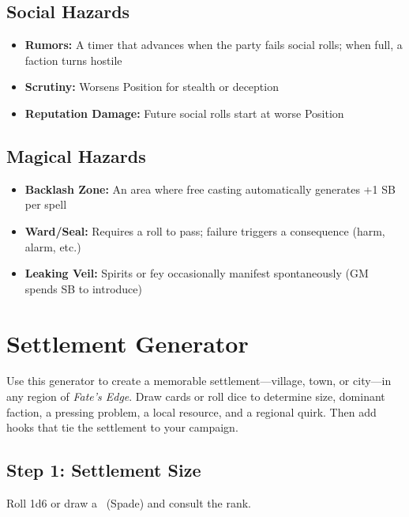 \subsection{Social Hazards}
\begin{itemize}
  \item \textbf{Rumors:} A timer that advances when the party fails social rolls; when full, a faction turns hostile
  \item \textbf{Scrutiny:} Worsens Position for stealth or deception
  \item \textbf{Reputation Damage:} Future social rolls start at worse Position
\end{itemize}

\subsection{Magical Hazards}
\begin{itemize}
  \item \textbf{Backlash Zone:} An area where free casting automatically generates +1 SB per spell
  \item \textbf{Ward/Seal:} Requires a roll to pass; failure triggers a consequence (harm, alarm, etc.)
  \item \textbf{Leaking Veil:} Spirits or fey occasionally manifest spontaneously (GM spends SB to introduce)
\end{itemize}

\clearpage
\section{Settlement Generator}
\label{sec:settlement-generator}

Use this generator to create a memorable settlement---village, town, or city---in any region of \textit{Fate's Edge}. Draw cards or roll dice to determine size, dominant faction, a pressing problem, a local resource, and a regional quirk. Then add hooks that tie the settlement to your campaign.

\subsection{Step 1: Settlement Size}
\label{sec:settlement-size}
Roll 1d6 or draw a \spadesuit\ (Spade) and consult the rank.

